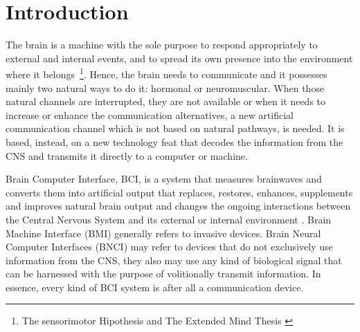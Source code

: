 \chapter{Introduction}



The brain is a machine with the sole purpose to respond appropriately to external and internal events, and to spread its own presence into the environment where it belongs~\footnote{The sensorimotor Hipothesis \cite{young1970,WolpawJonathanR2012} and The Extended Mind Thesis \cite{clark2008}}.  Hence, the brain needs to communicate and it possesses mainly two natural ways to do it: hormonal or neuromuscular.  When those natural channels are interrupted, they are not available or when it needs to increase or enhance the communication alternatives, a new artificial communication channel which is not based on natural pathways, is needed. It is based, instead, on a new technology feat that decodes the information from the CNS and transmits it directly to a computer or machine.

Brain Computer Interface, BCI, is a system that measures brainwaves and converts them into artificial output that replaces, restores, enhances, supplements and improves natural brain output and changes the ongoing interactions between the Central Nervous System and its external or internal environment \cite{WolpawJonathanR2012}. Brain Machine Interface (BMI) generally refers to invasive devices. Brain Neural Computer Interfaces (BNCI) may refer to devices that do not exclusively use information from the CNS, they also may use any kind of biological signal that can be harnessed with the purpose of volitionally transmit information. In essence, every kind of BCI system is after all a communication device.

